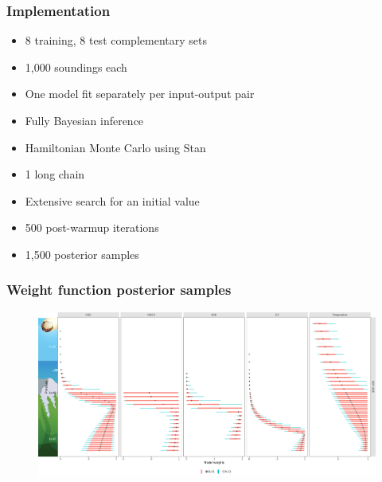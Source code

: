 \documentclass[aspectratio=169,t,xcolor=table]{beamer}
\begin{document}
\begin{frame}
  \frametitle{Implementation}
  \begin{itemize}
  \item 8 training, 8 test complementary sets
  \item 1,000 soundings each
  \item One model fit separately per input-output pair
  \item Fully Bayesian inference
  \item Hamiltonian Monte Carlo using Stan
  \item 1 long chain
  \item Extensive search for an initial value
  \item 500 post-warmup iterations
  \item 1,500 posterior samples
  \end{itemize}
\end{frame}

\begin{frame}
  \frametitle{Weight function posterior samples}

  \begin{figure}
    \centering
    \includegraphics[width=1\textwidth]{image2934-8.png}
  \end{figure}
\end{frame}
\end{document}
